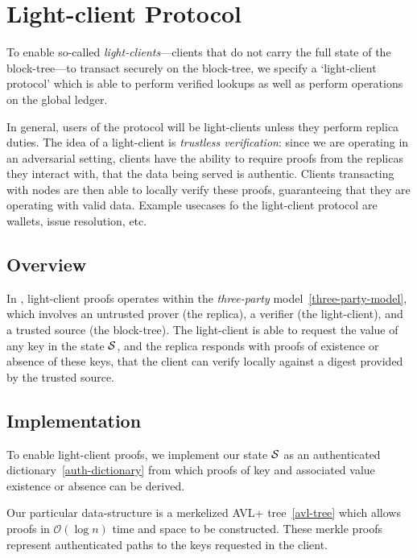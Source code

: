 \section{Light-client Protocol}

To enable so-called \emph{light-clients}---clients that do not carry the full
state of the block-tree---to transact securely on the block-tree, we specify a
`light-client protocol' which is able to perform verified lookups as well as
perform operations on the global ledger.

In general, users of the protocol will be light-clients unless they perform
replica duties. The idea of a light-client is \emph{trustless verification}:
since we are operating in an adversarial setting, clients have the ability to
require proofs from the replicas they interact with, that the data being served
is authentic. Clients transacting with nodes are then able to locally verify
these proofs, guaranteeing that they are operating with valid data. Example
usecases fo the light-client protocol are wallets, issue resolution, etc.

\subsection{Overview}

In \oscoin{}, light-client proofs operates within the \emph{three-party}
model~\ref{three-party-model}, which involves an untrusted prover (the
replica), a verifier (the light-client), and a trusted source (the block-tree).
The light-client is able to request the value of any key in the state $\mathcal{S}$,
and the replica responds with proofs of existence or absence of these keys, that
the client can verify locally against a digest provided by the trusted source.

\subsection{Implementation}

To enable light-client proofs, we implement our state $\mathcal{S}$ as an
authenticated dictionary~\ref{auth-dictionary} from which proofs of key and
associated value existence or absence can be derived.

Our particular data-structure is a merkelized AVL+ tree~\ref{avl-tree} which
allows proofs in $\mathcal{O}(\log n)$ time and space to be constructed. These
merkle proofs represent authenticated paths to the keys requested in the client.

